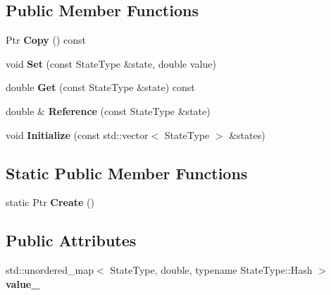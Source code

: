 \subsection*{Public Member Functions}
\begin{DoxyCompactItemize}
\item 
\hypertarget{structrl_1_1_discrete_state_value_ac9455d62ca0a9ead9a06f956d2a1d881}{}\label{structrl_1_1_discrete_state_value_ac9455d62ca0a9ead9a06f956d2a1d881} 
Ptr {\bfseries Copy} () const
\item 
\hypertarget{structrl_1_1_discrete_state_value_a6e5f925b801c015c590d31fed2ef38fd}{}\label{structrl_1_1_discrete_state_value_a6e5f925b801c015c590d31fed2ef38fd} 
void {\bfseries Set} (const State\+Type \&state, double value)
\item 
\hypertarget{structrl_1_1_discrete_state_value_a59e7a0a7c20449976489311bc3f64bae}{}\label{structrl_1_1_discrete_state_value_a59e7a0a7c20449976489311bc3f64bae} 
double {\bfseries Get} (const State\+Type \&state) const
\item 
\hypertarget{structrl_1_1_discrete_state_value_ae30aba0b11b37c2d9e84da5a8fecf462}{}\label{structrl_1_1_discrete_state_value_ae30aba0b11b37c2d9e84da5a8fecf462} 
double \& {\bfseries Reference} (const State\+Type \&state)
\item 
\hypertarget{structrl_1_1_discrete_state_value_a71d41cf4de1fe6b9aa0fc61caeee8848}{}\label{structrl_1_1_discrete_state_value_a71d41cf4de1fe6b9aa0fc61caeee8848} 
void {\bfseries Initialize} (const std\+::vector$<$ State\+Type $>$ \&states)
\end{DoxyCompactItemize}
\subsection*{Static Public Member Functions}
\begin{DoxyCompactItemize}
\item 
\hypertarget{structrl_1_1_discrete_state_value_abe61bfc377472c561240e2d33243648c}{}\label{structrl_1_1_discrete_state_value_abe61bfc377472c561240e2d33243648c} 
static Ptr {\bfseries Create} ()
\end{DoxyCompactItemize}
\subsection*{Public Attributes}
\begin{DoxyCompactItemize}
\item 
\hypertarget{structrl_1_1_discrete_state_value_a1a294921cdddf9a9ddfbd045069b1272}{}\label{structrl_1_1_discrete_state_value_a1a294921cdddf9a9ddfbd045069b1272} 
std\+::unordered\+\_\+map$<$ State\+Type, double, typename State\+Type\+::\+Hash $>$ {\bfseries value\+\_\+}
\end{DoxyCompactItemize}


